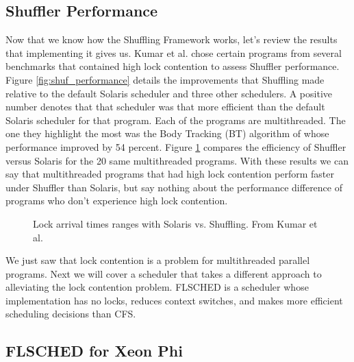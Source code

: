 \documentclass{sig-alternate}
\begin{document}
\subsection{Shuffler Performance}

Now that we know how the Shuffling Framework works, let's review the results that implementing it gives us. Kumar et al. chose certain programs from several benchmarks that contained high lock contention to assess Shuffler performance. Figure \ref{fig:shuf_performance} details the improvements that Shuffling made relative to the default Solaris scheduler and three other schedulers. A positive number denotes that that scheduler was that more efficient than the default Solaris scheduler for that program. Each of the programs are multithreaded. The one they highlight the most was the Body Tracking (BT) algorithm of whose performance improved by 54 percent. Figure \ref{fig:shuf_vs_solaris} compares the efficiency of Shuffler versus Solaris for the 20 same multithreaded programs. With these results we can say that multithreaded programs that had high lock contention perform faster under Shuffler than Solaris, but say nothing about the performance difference of programs who don't experience high lock contention.~\cite{Kumar:2014}

\begin{figure}
\centering
{}
\caption{Lock arrival times ranges with Solaris vs. Shuffling. From Kumar et al.~\cite{Kumar:2014}}
\label{fig:shuf_vs_solaris}
\end{figure}

We just saw that lock contention is a problem for multithreaded parallel programs. Next we will cover a scheduler that takes a different approach to alleviating the lock contention problem. FLSCHED is a scheduler whose implementation has no locks, reduces context switches, and makes more efficient scheduling decisions than CFS.~\cite{Jo:2017}

\subsection{FLSCHED for Xeon Phi}
\label{sec:flsched}
\end{document}
